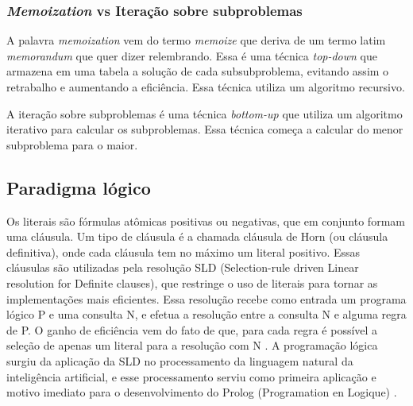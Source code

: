 \subsubsection{\textit{Memoization} vs Iteração sobre subproblemas} 
A palavra \textit{memoization} vem do termo \textit{memoize} que deriva de um termo latim \textit{memorandum} que quer dizer relembrando. Essa é uma técnica \textit{top-down} que  armazena em uma tabela a solução de cada subsubproblema, evitando assim o retrabalho e aumentando a eficiência. Essa técnica utiliza um algoritmo recursivo.

A iteração sobre subproblemas é uma técnica \textit{bottom-up} que utiliza um algoritmo iterativo para calcular os subproblemas. Essa técnica começa a calcular do menor subproblema para o maior. 

\subsection{Paradigma lógico}
Os literais são fórmulas atômicas positivas ou negativas, que em conjunto formam uma cláusula. Um tipo de cláusula é a chamada cláusula de Horn (ou cláusula definitiva), onde cada cláusula tem no máximo um literal positivo. Essas cláusulas são utilizadas pela resolução SLD (Selection-rule driven Linear resolution for Definite clauses), que restringe o uso de literais para tornar as implementações mais eficientes. Essa resolução recebe como entrada um programa lógico P e uma consulta N, e efetua a resolução entre a consulta N e alguma regra de P. O ganho de eficiência vem do fato de que, para cada regra é possível a seleção de apenas um literal para a resolução com N \cite{rodrigues2010fundamentos}.
A programação lógica surgiu da aplicação da SLD no processamento da linguagem natural da  inteligência artificial, e esse processamento serviu como primeira aplicação e motivo imediato para o desenvolvimento do Prolog (Programation en Logique) \cite{rodrigues2010fundamentos}.
